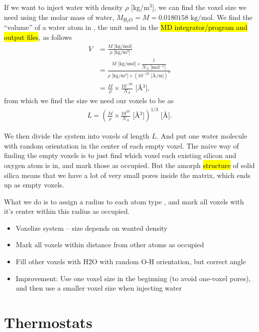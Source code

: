If we want to inject water with density $\rho$ [kg/m$^3$], we can find the voxel size we need using the molar mass of water, $M_\text{H$_2$O} = M = 0.0180158 \text{ kg/mol}$. We find the ``volume'' of a water atom in \Ang, the unit used in the \hl{MD integrator/program and output files}, as follows
\begin{align*}
    V 
    &= \frac{ M\text{ [kg/mol]} }{ \rho\text{ [kg/m$^3$]} } \\
    &= \frac{
            M\text{ [kg/mol]} \times \dfrac{1}{N_A \text{ [mol$^{-1}$]}}
        }{
            \rho\text{ [kg/m$^3$]} \times \left(10^{-10} \text{ [\AA/m]}\right)^3
        } \\
    &= \frac{M}{\rho} \times \frac{10^{-30}}{N_A} \text{ [\AA$^3$]},
\end{align*}
from which we find the size we need our voxels to be as
\begin{align*}
    L = \left(\frac{M}{\rho} \times \frac{10^{30}}{N_A} \text{ [\AA$^3$]}\right)^{1/3}\text{ [\AA]}.
\end{align*}

We then divide the system into voxels of length $L$. And put one water molecule with random orientation in the center of each empty voxel. The naive way of finding the empty voxels is to just find which voxel each existing silicon and oxygen atom is in, and mark those as occupied. But the amorph \hl{structure} of solid silica means that we have a lot of very small pores inside the matrix, which ends up as empty voxels. 

What we do is to assign a radius to each atom type , and mark all voxels with it's center within this radius as occupied.

\begin{itemize}
    \item Voxelize system -- size depends on wanted density
    \item Mark all voxels within distance from other atoms as occupied
    \item Fill other voxels with H2O with random O-H orientation, but correct angle
    \item Improvement: Use one voxel size in the beginning (to avoid one-voxel pores), and then use a smaller voxel size when injecting water
\end{itemize}

\section{Thermostats}
